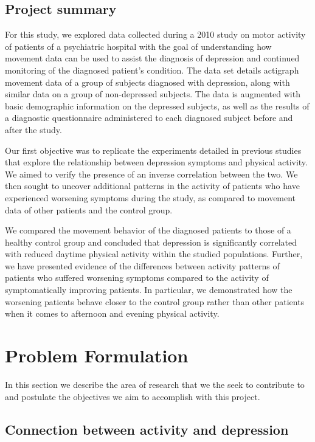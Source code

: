\documentclass[12pt]{article}
\begin{document}
\subsection{Project summary}

For this study, we explored data collected during a 2010 study on motor activity of patients of a psychiatric hospital with the goal of understanding how movement data can be used to assist the diagnosis of depression and continued monitoring of the diagnosed patient's condition. The data set details actigraph movement data of a group of subjects diagnosed with depression, along with similar data on a group of non-depressed subjects. The data is augmented with basic demographic information on the depressed subjects, as well as the results of a diagnostic questionnaire administered to each diagnosed subject before and after the study.

Our first objective was to replicate the experiments detailed in previous studies that explore the relationship between depression symptoms and physical activity. We aimed to verify the presence of an inverse correlation between the two. We then sought to uncover additional patterns in the activity of patients who have experienced worsening symptoms during the study, as compared to movement data of other patients and the control group.

We compared the movement behavior of the diagnosed patients to those of a healthy control group and concluded that depression is significantly correlated with reduced daytime physical activity within the studied populations. Further, we have presented evidence of the differences between activity patterns of patients who suffered worsening symptoms compared to the activity of symptomatically improving patients. In particular, we demonstrated how the worsening patients behave closer to the control group rather than other patients when it comes to afternoon and evening physical activity.

\section{Problem Formulation}

In this section we describe the area of research that we the seek to contribute to and postulate the objectives we aim to accomplish with this project.

\subsection{Connection between activity and depression}
\end{document}
